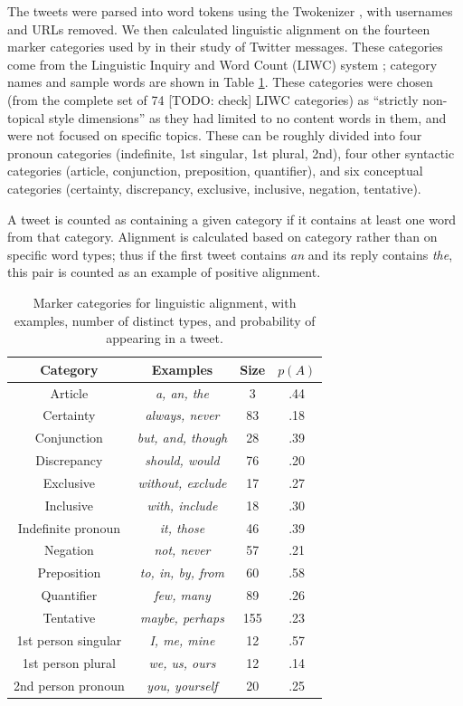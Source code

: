 \documentclass{acm_proc_article-sp}
\begin{document}
The tweets were parsed into word tokens using the Twokenizer \cite{OwoputiEtAl2013}, with usernames and URLs removed.  We then calculated linguistic alignment on the fourteen marker categories used by \cite{DNMGamonDumais2011} in their study of Twitter messages.  These categories come from the Linguistic Inquiry and Word Count (LIWC) system \cite{LIWC}; category names and sample words are shown in Table \ref{tab:LIWC}. These categories were chosen (from the complete set of 74 [TODO: check] LIWC categories) as ``strictly non-topical style dimensions'' as they had limited to no content words in them, and were not focused on specific topics.  These can be roughly divided into four pronoun categories (indefinite, 1st singular, 1st plural, 2nd), four other syntactic categories (article, conjunction, preposition, quantifier), and six conceptual categories (certainty, discrepancy, exclusive, inclusive, negation, tentative).

A tweet is counted as containing a given category if it contains at least one word from that category.  Alignment is calculated based on category rather than on specific word types; thus if the first tweet contains \textit{an} and its reply contains \textit{the}, this pair is counted as an example of positive alignment.

\begin{table}
\centering
\caption{Marker categories for linguistic alignment, with examples, number of distinct types, and probability of appearing in a tweet.}\label{tab:LIWC}
\begin{tabular}{|c|c|c|c|} \hline
Category & Examples & Size & $p(A)$\\ \hline
Article & \textit{a, an, the} & 3 & .44 \\
Certainty  & \textit{always, never} & 83 & .18 \\
Conjunction  & \textit{but, and, though} & 28 & .39\\
Discrepancy  & \textit{should, would} & 76 & .20 \\
Exclusive  & \textit{without, exclude} & 17 & .27\\
Inclusive  & \textit{with, include} & 18 & .30\\
Indefinite pronoun  & \textit{it, those} & 46 & .39\\
Negation  & \textit{not, never} & 57 & .21\\
Preposition  & \textit{to, in, by, from} & 60 & .58\\
Quantifier  & \textit{few, many} & 89 & .26\\
Tentative & \textit{maybe, perhaps} & 155 & .23\\
1st person singular  & \textit{I, me, mine} & 12 & .57\\
1st person plural & \textit{we, us, ours} & 12 & .14\\
2nd person pronoun   & \textit{you, yourself} & 20 & .25\\
\hline\end{tabular}
\end{table}
\end{document}
